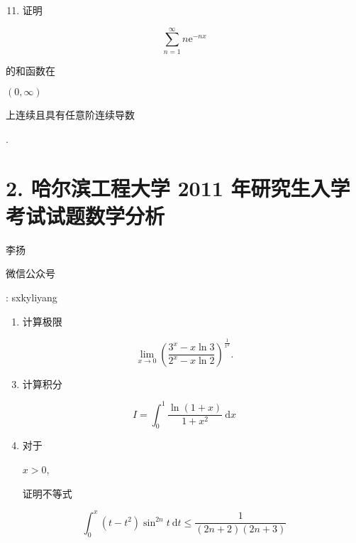 \documentclass[10pt]{article}
\begin{document}
\begin{enumerate}
  \setcounter{enumi}{10}
  \item \begin{CJK}{UTF8}{mj}证明\end{CJK}
\end{enumerate}
$$
\sum_{n=1}^{\infty} n \mathrm{e}^{-n x}
$$
\begin{CJK}{UTF8}{mj}的和函数在\end{CJK} $(0, \infty)$ \begin{CJK}{UTF8}{mj}上连续且具有任意阶连续导数\end{CJK}.

\section{2. 哈尔滨工程大学 2011 年研究生入学考试试题数学分析}
\begin{CJK}{UTF8}{mj}李扬\end{CJK}

\begin{CJK}{UTF8}{mj}微信公众号\end{CJK}: sxkyliyang

\begin{enumerate}
  \item \begin{CJK}{UTF8}{mj}计算极限\end{CJK}
\end{enumerate}
$$
\lim _{x \rightarrow 0}\left(\frac{3^{x}-x \ln 3}{2^{x}-x \ln 2}\right)^{\frac{1}{x^{2}}} .
$$

\begin{enumerate}
  \setcounter{enumi}{2}
  \item \begin{CJK}{UTF8}{mj}计算积分\end{CJK}
\end{enumerate}
$$
I=\int_{0}^{1} \frac{\ln (1+x)}{1+x^{2}} \mathrm{~d} x
$$

\begin{enumerate}
  \setcounter{enumi}{3}
  \item \begin{CJK}{UTF8}{mj}对于\end{CJK} $x>0$, \begin{CJK}{UTF8}{mj}证明不等式\end{CJK}
\end{enumerate}
$$
\int_{0}^{x}\left(t-t^{2}\right) \sin ^{2 n} t \mathrm{~d} t \leq \frac{1}{(2 n+2)(2 n+3)}
$$
\end{document}
